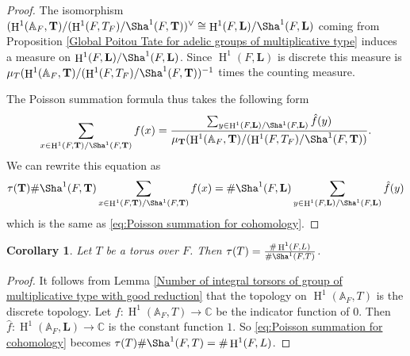 \documentclass[a4paper,11pt,reqno]{amsart}
\newcommand{\C}{\mathbb{C}}
\newcommand{\A}{\mathbb{A}}
\DeclareMathOperator{\HH}{H}
\newtheorem{corollary}[theorem]{Corollary}
\theoremstyle{definition}
\begin{document}
\begin{proof}
	The isomorphism $(\HH^1(\A_F, \mathbf{T})/(\HH^1(F, T_F)/\Sha^1(F, \mathbf{T}))^{\vee} \cong \HH^1(F, \mathbf{L})/\Sha^1(F, \mathbf{L})$ coming from Proposition \ref{Global Poitou Tate for adelic groups of multiplicative type} induces a measure on $\HH^1(F, \mathbf{L})/\Sha^1(F, \mathbf{L})$. Since $\HH^1(F, \mathbf{L})$ is discrete this measure is $\mu_T(\HH^1(\A_F, \mathbf{T})/(\HH^1(F, T_F)/\Sha^1(F, \mathbf{T}))^{-1}$ times the counting measure.
	
	The Poisson summation formula thus takes the following form
	\begin{equation*}
		\sum_{x \in \HH^1(F, \mathbf{T})/\Sha^1(F, \mathbf{T})} f(x) = \frac{\sum_{y \in \HH^1(F, \mathbf{L})/\Sha^1(F, \mathbf{L})} \hat{f}(y)}{\mu_{\mathbf{T}}(\HH^1(\A_F, \mathbf{T})/(\HH^1(F, T_F)/\Sha^1(F, \mathbf{T}))}.
	\end{equation*}
	We can rewrite this equation as
	\begin{equation*}
		\tau(\mathbf{T}) \#\Sha^1(F, \mathbf{T}) \sum_{x \in \HH^1(F, \mathbf{T})/\Sha^1(F, \mathbf{T})} f(x) = \# \Sha^1(F, \mathbf{L}) \sum_{y \in \HH^1(F, \mathbf{L})/\Sha^1(F, \mathbf{L})}\hat{f}(y)
	\end{equation*}
	which is the same as \eqref{eq:Poisson summation for cohomology}.
\end{proof}
\begin{corollary}
	Let $T$ be a torus over $F$. Then $\tau(T) = \frac{\# \HH^1(F, L)}{\# \Sha^1(F, T)}$.
	\label{Tamagawa number of tori}
\end{corollary}
\begin{proof}
	It follows from Lemma \ref{Number of integral torsors of group of multiplicative type with good reduction} that the topology on $\HH^1(\A_F, T)$ is the discrete topology. Let $f: \HH^1(\A_F, T) \to \C$ be the indicator function of $0$. Then $\hat{f}: \HH^1(\A_F, \mathbf{L}) \to \C$ is the constant function $1$. So \eqref{eq:Poisson summation for cohomology} becomes $\tau(T) \# \Sha^1(F, T) = \# \HH^1(F, L)$.
\end{proof}
\end{document}
